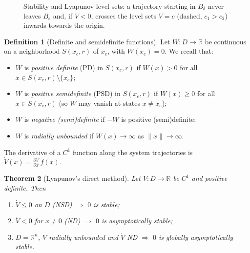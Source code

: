 \documentclass[11pt,a4paper]{article}
\def\bm#1{#1}%
\newcommand{\R}{\mathbb{R}}
\theoremstyle{definition}
\newtheorem{definition}{Definition}[section]
\theoremstyle{plain}
\newtheorem{theorem}[definition]{Theorem}
\theoremstyle{remark}
\begin{document}
\begin{figure}[ht]
\centering
{}
\caption{Stability and Lyapunov level sets: a trajectory starting in $B_\delta$ never leaves $B_\varepsilon$ and, if $\dot V<0$, crosses the level sets $V=c$ (dashed, $c_1>c_2$) inwards towards the origin.}
\end{figure}

\begin{definition}[Definite and semidefinite functions]
Let $W:D\to\R$ be continuous on a neighborhood $S(\bm x_e,r)$ of $\bm x_e$, with $W(\bm x_e)=0$. We recall that:
\begin{itemize}[leftmargin=*,nosep]
\item $W$ is \emph{positive definite} (PD) in $S(\bm x_e,r)$ if $W(\bm x)>0$ for all $\bm x\in S(\bm x_e,r)\setminus\{\bm x_e\}$;
\item $W$ is \emph{positive semidefinite} (PSD) in $S(\bm x_e,r)$ if $W(\bm x)\ge0$ for all $\bm x\in S(\bm x_e,r)$ (so $W$ may vanish at states $\bm x\ne\bm x_e$);
\item $W$ is \emph{negative (semi)definite} if $-W$ is positive (semi)definite;
\item $W$ is \emph{radially unbounded} if $W(\bm x)\to\infty$ as $\|\bm x\|\to\infty$.
\end{itemize}
The derivative of a $C^1$ function along the system trajectories is $\dot V(\bm x)=\frac{\partial V}{\partial\bm x}\,\bm f(\bm x)$.
\end{definition}

\begin{theorem}[Lyapunov's direct method]\label{thm:lyap}
Let $V:D\to\R$ be $C^1$ and positive definite. Then
\begin{enumerate}[label=(\roman*),leftmargin=*,nosep]
\item $\dot V\le0$ on $D$ (NSD) $\Rightarrow$ $\bm 0$ is stable;
\item $\dot V<0$ for $\bm x\ne\bm 0$ (ND) $\Rightarrow$ $\bm 0$ is asymptotically stable;
\item $D=\R^n$, $V$ radially unbounded and $\dot V$ ND $\Rightarrow$ $\bm 0$ is globally asymptotically stable.
\end{enumerate}
\end{theorem}
\end{document}
